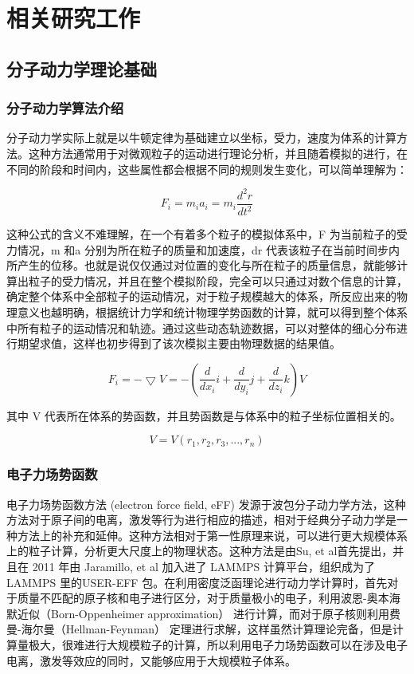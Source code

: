 
\chapter{相关研究工作}
\section{分子动力学理论基础}
\subsection{分子动力学算法介绍}
分子动力学实际上就是以牛顿定律为基础建立以坐标，受力，速度为体系的计算方法\cite{rapaport2004art}。这种方法通常用于对微观粒子的运动进行理论分析，并且随着模拟的进行，在不同的阶段和时间内，这些属性都会根据不同的规则发生变化，可以简单理解为：

\begin{equation}
  F_i = m_ia_i = m_i\frac{d^2r}{dt^2}
\end{equation}

这种公式的含义不难理解，在一个有着多个粒子的模拟体系中，F 为当前粒子的受力情况，m 和a 分别为所在粒子的质量和加速度，dr 代表该粒子在当前时间步内所产生的位移。也就是说仅仅通过对位置的变化与所在粒子的质量信息，就能够计算出粒子的受力情况，并且在整个模拟阶段，完全可以只通过对数个信息的计算，确定整个体系中全部粒子的运动情况，对于粒子规模越大的体系，所反应出来的物理意义也越明确，根据统计力学和统计物理学势函数的计算，就可以得到整个体系中所有粒子的运动情况和轨迹。通过这些动态轨迹数据，可以对整体的细心分布进行期望求值，这样也初步得到了该次模拟主要由物理数据的结果值。

\begin{equation}
  F_i = -\bigtriangledown V =-(\frac{d}{dx_i}i+\frac{d}{dy_i}j+\frac{d}{dz_i}k)V
\end{equation}

其中 V 代表所在体系的势函数，并且势函数是与体系中的粒子坐标位置相关的。

\begin{equation}
  V=V(r_1,r_2,r_3,...,r_n)
\end{equation}

\subsection{电子力场势函数}
电子力场势函数方法 (electron force field, eFF) 发源于波包分子动力学方法，这种方法对于原子间的电离，激发等行为进行相应的描述，相对于经典分子动力学是一种方法上的补充和延伸。这种方法相对于第一性原理来说，可以进行更大规模体系上的粒子计算，分析更大尺度上的物理状态。这种方法是由Su, et al\cite{su2007excited}首先提出，并且在 2011 年由 Jaramillo, et al\cite{jaramillo2011large} 加入进了 LAMMPS 计算平台\cite{plimpton1995fast}，组织成为了LAMMPS 里的USER-EFF 包。在利用密度泛函理论进行动力学计算时，首先对于质量不匹配的原子核和电子进行区分，对于质量极小的电子，利用波恩-奥本海默近似（Born-Oppenheimer approximation）\cite{born1985quantentheorie} 进行计算，而对于原子核则利用费曼-海尔曼（Hellman-Feynman）\cite{feynman1939forces} 定理进行求解，这样虽然计算理论完备，但是计算量极大，很难进行大规模粒子的计算，所以利用电子力场势函数可以在涉及电子电离，激发等效应的同时，又能够应用于大规模粒子体系。


